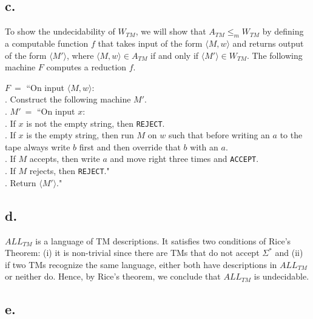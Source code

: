 \documentclass[12pt]{article}
\begin{document}
\subsection*{c.}

To show the undecidability of $W_{TM}$, we will show that $A_{TM} \leq_m W_{TM}$ by defining a computable function $f$ that takes input of the form $\langle M, w \rangle$ and returns output of the form $\langle M' \rangle$, where $\langle M, w \rangle \in A_{TM}$ if and only if $\langle M' \rangle \in W_{TM}$. The following machine $F$ computes a reduction $f$.


$F \ =$ ``On input $\langle M, w \rangle$:\\
	\indent{}. Construct the following machine $M'$.\\
	\indent{}. $M' \ =$ ``On input $x$:\\
	\indent\indent\indent{}. If $x$ is not the empty string, then \texttt{REJECT}.\\
	\indent\indent\indent{}. If $x$ is the empty string, then run $M$ on $w$ such that before writing an $a$ to the \indent\indent\indent\indent tape always write $b$ first and then override that $b$ with an $a$.\\
	\indent\indent\indent{}. If $M$ accepts, then write $a$ and move right three times and \texttt{ACCEPT}.\\
	\indent\indent\indent{}. If $M$ rejects, then \texttt{REJECT}."\\
	\indent{}. Return $\langle M' \rangle$."


\subsection*{d.}

$ALL_{TM}$ is a language of TM descriptions. It satisfies two conditions of Rice’s Theorem: (i) it is non-trivial since there are TMs that do not accept $\Sigma^*$ and (ii) if two TMs recognize the same language, either both have descriptions in $ALL_{TM}$ or neither do. Hence, by Rice’s theorem, we conclude that $ALL_{TM}$ is undecidable.

\subsection*{e.}
\end{document}
